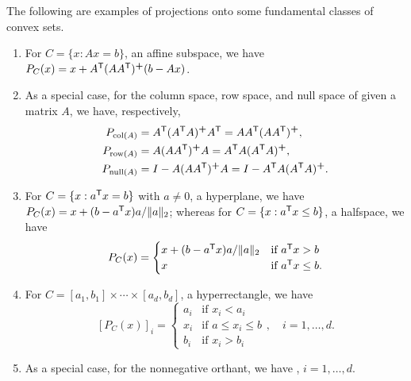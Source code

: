 \begin{Example}
\label{xa:projection_mappings}
The following are examples of projections onto some fundamental classes of
convex sets.

\begin{enumerate}[label=\alph*., ref=\alph*]
\item For $C = \{x : Ax = b\}$, an affine subspace, we have $P_C(x) = x + A^{\mathsf{T}}
  (A A^{\mathsf{T}})^{\bm{+}} (b - Ax)$.  

\item {}
  As a special case, for the column space, row space, and null space of given a
  matrix $A$, we have, respectively,  
  \begin{align*}
  P_{\operatorname{col}(A)} &= A^{\mathsf{T}} (A^{\mathsf{T}} A)^{\bm{+}} A^{\mathsf{T}} = A A^{\mathsf{T}} (A A^{\mathsf{T}})^{\bm{+}}, \\
  P_{\operatorname{row}(A)} &= A (A A^{\mathsf{T}})^{\bm{+}} A = A^{\mathsf{T}} A (A^{\mathsf{T}} A)^{\bm{+}}, \\
  P_{\operatorname{null}(A)} &= I - A (A A^{\mathsf{T}})^{\bm{+}} A = I - A^{\mathsf{T}} A (A^{\mathsf{T}} A)^{\bm{+}}.
  \end{align*}

\item For $C = \{x : a^{\mathsf{T}} x = b\}$ with $a \not= 0$, a hyperplane, we have
  $P_C(x) = x + (b - a^{\mathsf{T}} x) a / \|a\|_2$; whereas for $C = \{x : a^{\mathsf{T}} x \leq
  b\}$, a halfspace, we have   
  \[
  P_C(x) = 
  \begin{cases}
  x + (b - a^{\mathsf{T}} x) a / \|a\|_2 & \text{if $a^{\mathsf{T}} x > b$} \\
  x & \text{if $a^{\mathsf{T}} x \leq b$}.
  \end{cases}
  \]

\item For $C = [a_1, b_1] \times \cdots \times [a_d, b_d]$, a hyperrectangle, we
  have  
  \[
  [P_C(x)]_i = 
  \begin{cases}
  a_i & \text{if $x_i < a_i$} \\
  x_i & \text{if $a \leq x_i \leq b$} \\
  b_i & \text{if $x_i > b_i$}
  \end{cases},
  \quad i = 1,\dots,d.
  \]

\item As a special case, for the nonnegative orthant, we have
  , $i=1,\dots,d$.  


\end{enumerate}
\end{Example}
